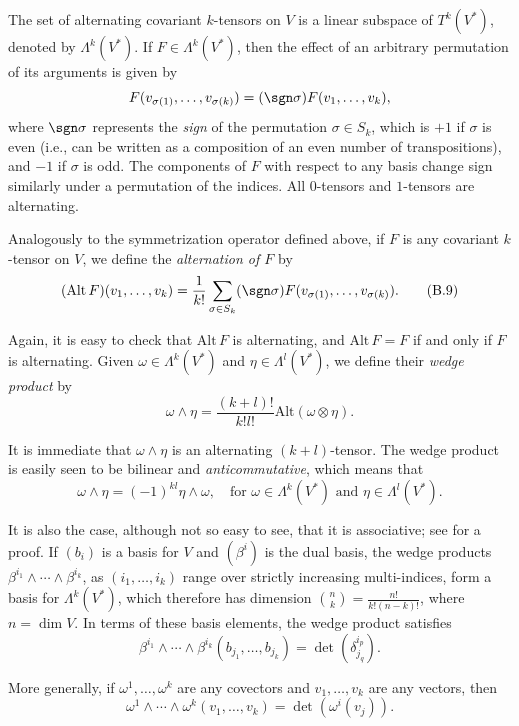 The set of alternating covariant $k$-tensors on $V$ is a linear subspace of $T^k(V^*)$, denoted by $\Lambda^k(V^*)$. If $F \in \Lambda^k(V^*)$, then the effect of an arbitrary permutation of its arguments is given by
\[
F(v_{\sigma(1)},\ldots,v_{\sigma(k)}) = (\sgn \sigma)F(v_1,\ldots,v_k),
\]
where $\sgn \sigma$ represents the \textit{sign} of the permutation $\sigma \in S_k$, which is $+1$ if $\sigma$ is even (i.e., can be written as a composition of an even number of transpositions), and $-1$ if $\sigma$ is odd. The components of $F$ with respect to any basis change sign similarly under a permutation of the indices. All $0$-tensors and $1$-tensors are alternating.

Analogously to the symmetrization operator defined above, if $F$ is any covariant $k$-tensor on $V$, we define the \textit{alternation of $F$} by
\begin{equation}
(\mathrm{Alt}\, F)(v_1,\ldots,v_k) = \frac{1}{k!} \sum_{\sigma \in S_k} (\sgn \sigma) F(v_{\sigma(1)},\ldots,v_{\sigma(k)}).
\tag{B.9}
\end{equation}

Again, it is easy to check that $\mathrm{Alt}\, F$ is alternating, and $\mathrm{Alt}\, F = F$ if and only if $F$ is alternating. Given $\omega \in \Lambda^k(V^*)$ and $\eta \in \Lambda^l(V^*)$, we define their \textit{wedge product} by
\[
\omega \wedge \eta = \frac{(k+l)!}{k!l!} \mathrm{Alt}(\omega \otimes \eta).
\]

It is immediate that $\omega \wedge \eta$ is an alternating $(k + l)$-tensor. The wedge product is easily seen to be bilinear and \textit{anticommutative}, which means that
\[
\omega \wedge \eta = (-1)^{kl} \eta \wedge \omega, \quad \text{for } \omega \in \Lambda^k(V^*) \text{ and } \eta \in \Lambda^l(V^*).
\]

It is also the case, although not so easy to see, that it is associative; see \cite[Prop.~14.11]{LeeSM} for a proof. If $(b_i)$ is a basis for $V$ and $(\beta^i)$ is the dual basis, the wedge products $\beta^{i_1} \wedge \cdots \wedge \beta^{i_k}$, as $(i_1,\ldots,i_k)$ range over strictly increasing multi-indices, form a basis for $\Lambda^k(V^*)$, which therefore has dimension $\binom{n}{k} = \frac{n!}{k!(n-k)!}$, where $n = \dim V$. In terms of these basis elements, the wedge product satisfies
\[
\beta^{i_1} \wedge \cdots \wedge \beta^{i_k}(b_{j_1},\ldots,b_{j_k}) = \det(\delta^{i_p}_{j_q}).
\]

More generally, if $\omega^1,\ldots,\omega^k$ are any covectors and $v_1,\ldots,v_k$ are any vectors, then
\begin{equation}
\omega^1 \wedge \cdots \wedge \omega^k(v_1,\ldots,v_k) = \det(\omega^i(v_j)).
\tag{B.10}
\end{equation}


